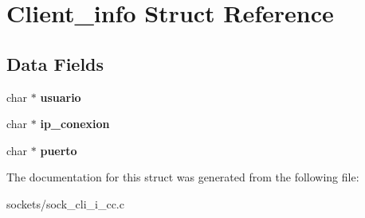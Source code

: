 \hypertarget{struct_client__info}{}\section{Client\+\_\+info Struct Reference}
\label{struct_client__info}
\subsection*{Data Fields}
\begin{DoxyCompactItemize}
\item 
char $\ast$ {\bfseries usuario}\hypertarget{struct_client__info_a0147a5b81499984f9cb00379a8cb84af}{}\label{struct_client__info_a0147a5b81499984f9cb00379a8cb84af}

\item 
char $\ast$ {\bfseries ip\+\_\+conexion}\hypertarget{struct_client__info_a823a62b2c586c74b288d3559d0bf8892}{}\label{struct_client__info_a823a62b2c586c74b288d3559d0bf8892}

\item 
char $\ast$ {\bfseries puerto}\hypertarget{struct_client__info_a00d07fc5e9ef3fceba4bc71080fa3bfc}{}\label{struct_client__info_a00d07fc5e9ef3fceba4bc71080fa3bfc}

\end{DoxyCompactItemize}


The documentation for this struct was generated from the following file\+:\begin{DoxyCompactItemize}
\item 
sockets/sock\+\_\+cli\+\_\+i\+\_\+cc.\+c\end{DoxyCompactItemize}

